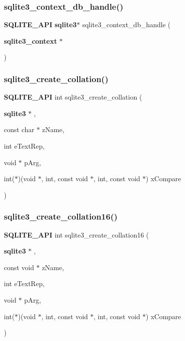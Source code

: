 \mbox{\label{sqlite3_8h_a5d6c5f2e81a8a245c4f8c384ad2442d4}} 
\subsubsection{sqlite3\_context\_db\_handle()}
{\footnotesize\ttfamily \textbf{ S\+Q\+L\+I\+T\+E\+\_\+\+A\+PI} \textbf{ sqlite3}$\ast$ sqlite3\+\_\+context\+\_\+db\+\_\+handle (\begin{DoxyParamCaption}\item[{\textbf{ sqlite3\+\_\+context} $\ast$}]{ }\end{DoxyParamCaption})}

\mbox{\label{sqlite3_8h_ae16a68d17915d0f18ab05ee246f54d0d}} 
\subsubsection{sqlite3\_create\_collation()}
{\footnotesize\ttfamily \textbf{ S\+Q\+L\+I\+T\+E\+\_\+\+A\+PI} int sqlite3\+\_\+create\+\_\+collation (\begin{DoxyParamCaption}\item[{\textbf{ sqlite3} $\ast$}]{,  }\item[{const char $\ast$}]{z\+Name,  }\item[{int}]{e\+Text\+Rep,  }\item[{void $\ast$}]{p\+Arg,  }\item[{int($\ast$)(void $\ast$, int, const void $\ast$, int, const void $\ast$)}]{x\+Compare }\end{DoxyParamCaption})}

\mbox{\label{sqlite3_8h_a445eeb90caf851d2c8e329142a5ee906}} 
\subsubsection{sqlite3\_create\_collation16()}
{\footnotesize\ttfamily \textbf{ S\+Q\+L\+I\+T\+E\+\_\+\+A\+PI} int sqlite3\+\_\+create\+\_\+collation16 (\begin{DoxyParamCaption}\item[{\textbf{ sqlite3} $\ast$}]{,  }\item[{const void $\ast$}]{z\+Name,  }\item[{int}]{e\+Text\+Rep,  }\item[{void $\ast$}]{p\+Arg,  }\item[{int($\ast$)(void $\ast$, int, const void $\ast$, int, const void $\ast$)}]{x\+Compare }\end{DoxyParamCaption})}

